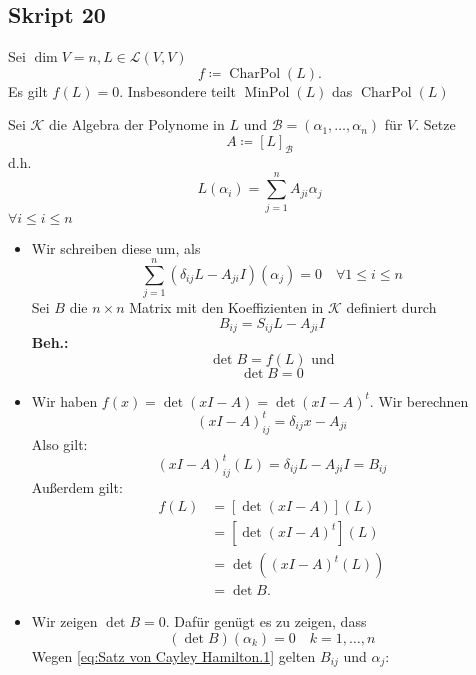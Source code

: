 \subsection{Skript 20}
\begin{subtheorem}
	Sei $ \dim V = n, L \in \mathcal{L} \left( V, V \right) $
	\[
		f \coloneqq \operatorname{Char Pol}(L).
	\]
	Es gilt $ f(L) = 0 $.
	Insbesondere teilt $ \operatorname{Min Pol}(L) $ das $ \operatorname{Char Pol}(L) $
\end{subtheorem}
\begin{subproof*}
	Sei $ \mathcal{K}  $ die Algebra der Polynome in $ L $ und $ \mathcal{B} = \left( \alpha_1, \dotsc, \alpha_n \right)  $ für $ V $.
	Setze
	\[
		A \coloneqq  [L]_{\mathcal{B} } 
	\]
	d.h.
	\[
		L(\alpha_i) = \sum_{j=1}^{n} A_{ji} \alpha_j
	\]
	$ \forall i \leq i \leq n $ 
	\begin{itemize}
		\item Wir schreiben diese um, als
			\begin{equation}
				\label{eq:Satz von Cayley Hamilton.1}
				\tag{$ 1 $}
				\sum_{j=1}^{n} \left( \delta_{ij} L - A_{ji} I \right) (\alpha_j) = 0 \quad \forall 1 \leq i \leq n
			\end{equation}
			Sei $ B $ die $ n \times n $ Matrix mit den Koeffizienten in $ \mathcal{K}  $ definiert durch
			\[
				B_{ij}  = S_{ij} L - A_{ji} I
			\]
			\textbf{Beh.:}
			\[
				\det B = f(L) \text{ und} 
			\]
			\[
				\det B = 0
			\]
		\item Wir haben $ f(x) = \det\left( xI - A \right) = \det \left( xI - A \right)^t $.
			Wir berechnen
			\[
				\left( xI - A \right) _{ij} ^t = \delta_{ij} x - A_{ji} 
			\]
			Also gilt:
			\[
				\left( xI - A \right) _{ij} ^t (L) = \delta_{ij} L - A_{ji} I = B_{ij} 
			\]
			Außerdem gilt:
			\begin{align*}
				f(L) &= \left[ \det \left( xI - A \right)  \right] (L) \\
				~ &= \left[ \det \left( xI - A \right) ^{t}  \right] (L) \\
				~ &= \det \left(  \left( xI - A \right) ^{t} (L) \right)  \\
				~ &= \det B.
			\end{align*}
		\item Wir zeigen $ \det B = 0 $. Dafür genügt es zu zeigen, dass
			\[
				\left( \det B \right) \left( \alpha_k \right) = 0 \quad k = 1, \dotsc, n
			\]
			Wegen \eqref{eq:Satz von Cayley Hamilton.1} gelten $ B_{ij}  $ und $ \alpha_j $:

\end{itemize}
\end{subproof*}
